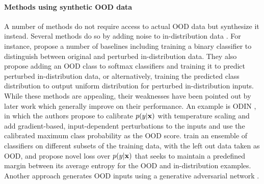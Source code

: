 \paragraph{Methods using synthetic OOD data}
A number of methods do not require access to actual OOD data but synthesize it instead. 
Several methods do so by adding noise to in-distribution data \parencite{liang_enhancing_2018, lee_simple_2018, ren_likelihood_2019}. 
For instance, \textcite{ren_likelihood_2019} propose a number of baselines including training a binary classifier to distinguish between original and perturbed in-distribution data. They also propose adding an OOD class to softmax classifiers and training it to predict perturbed in-distribution data, or alternatively, training the predicted class distribution to output uniform distribution for perturbed in-distribution inputs. 
While these methods are appealing, their weaknesses have been pointed out by later work which generally improve on their performance. An example is ODIN \parencite{liang_enhancing_2018}, in which the authors propose to calibrate $p(y|{\mathbf{x}})$ with temperature scaling \parencite{guo_calibration_2017} and add gradient-based, input-dependent perturbations to the inputs and use the calibrated maximum class probability as the OOD score. 
\textcite{vyas_outofdistribution_2018} train an ensemble of classifiers on different subsets of the training data, with the left out data taken as OOD, and propose novel loss over $p(y|{\mathbf{x}})$ that seeks to maintain a predefined margin between its average entropy for the OOD and in-distribution examples. 
Another approach generates OOD inputs using a generative adversarial network \parencite{lee_training_2018}. 


